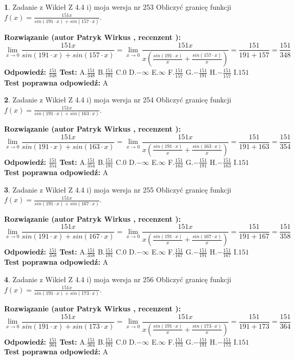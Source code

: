 \documentclass[12pt, a4paper]{article}
\theoremstyle{definition} %
\newtheorem{zad}{}
\newcommand{\zadStart}[1]{\begin{zad}#1\newline}
\newcommand{\zadStop}{\end{zad}}
\newcommand{\rozwStart}[2]{\noindent \textbf{Rozwiązanie (autor #1 , recenzent #2): }\newline}
\newcommand{\rozwStop}{\newline}
\newcommand{\odpStart}{\noindent \textbf{Odpowiedź:}\newline}
\newcommand{\odpStop}{\newline}
\newcommand{\testStart}{\noindent \textbf{Test:}\newline}
\newcommand{\testStop}{\newline}
\newcommand{\kluczStart}{\noindent \textbf{Test poprawna odpowiedź:}\newline}
\newcommand{\kluczStop}{\newline}
\begin{document}
\zadStart{Zadanie z Wikieł Z 4.4 i) moja wersja nr 253}
Obliczyć granicę funkcji $f(x)=\frac{151x}{sin(191\cdot x) +sin(157\cdot x)}$.
\zadStop
\rozwStart{Patryk Wirkus}{}
$$\lim\limits_{x\to 0}\frac{151x}{sin(191\cdot x) +sin(157\cdot x)}=\lim\limits_{x\to 0}\frac{151x}{x(\frac{sin(191\cdot x)}{x}+\frac{sin(157\cdot x)}{x})}=\frac{151}{191+157} = \frac{151}{348}$$
\rozwStop
\odpStart
$\frac{151}{348}$
\odpStop
\testStart
A.$\frac{151}{348}$
B.$\frac{151}{191}$
C.$0$
D.$-\infty$
E.$\infty$
F.$\frac{151}{157}$
G.$-\frac{151}{191}$
H.$-\frac{151}{157}$
I.$151$
\testStop
\kluczStart
A
\kluczStop



\zadStart{Zadanie z Wikieł Z 4.4 i) moja wersja nr 254}
Obliczyć granicę funkcji $f(x)=\frac{151x}{sin(191\cdot x) +sin(163\cdot x)}$.
\zadStop
\rozwStart{Patryk Wirkus}{}
$$\lim\limits_{x\to 0}\frac{151x}{sin(191\cdot x) +sin(163\cdot x)}=\lim\limits_{x\to 0}\frac{151x}{x(\frac{sin(191\cdot x)}{x}+\frac{sin(163\cdot x)}{x})}=\frac{151}{191+163} = \frac{151}{354}$$
\rozwStop
\odpStart
$\frac{151}{354}$
\odpStop
\testStart
A.$\frac{151}{354}$
B.$\frac{151}{191}$
C.$0$
D.$-\infty$
E.$\infty$
F.$\frac{151}{163}$
G.$-\frac{151}{191}$
H.$-\frac{151}{163}$
I.$151$
\testStop
\kluczStart
A
\kluczStop



\zadStart{Zadanie z Wikieł Z 4.4 i) moja wersja nr 255}
Obliczyć granicę funkcji $f(x)=\frac{151x}{sin(191\cdot x) +sin(167\cdot x)}$.
\zadStop
\rozwStart{Patryk Wirkus}{}
$$\lim\limits_{x\to 0}\frac{151x}{sin(191\cdot x) +sin(167\cdot x)}=\lim\limits_{x\to 0}\frac{151x}{x(\frac{sin(191\cdot x)}{x}+\frac{sin(167\cdot x)}{x})}=\frac{151}{191+167} = \frac{151}{358}$$
\rozwStop
\odpStart
$\frac{151}{358}$
\odpStop
\testStart
A.$\frac{151}{358}$
B.$\frac{151}{191}$
C.$0$
D.$-\infty$
E.$\infty$
F.$\frac{151}{167}$
G.$-\frac{151}{191}$
H.$-\frac{151}{167}$
I.$151$
\testStop
\kluczStart
A
\kluczStop



\zadStart{Zadanie z Wikieł Z 4.4 i) moja wersja nr 256}
Obliczyć granicę funkcji $f(x)=\frac{151x}{sin(191\cdot x) +sin(173\cdot x)}$.
\zadStop
\rozwStart{Patryk Wirkus}{}
$$\lim\limits_{x\to 0}\frac{151x}{sin(191\cdot x) +sin(173\cdot x)}=\lim\limits_{x\to 0}\frac{151x}{x(\frac{sin(191\cdot x)}{x}+\frac{sin(173\cdot x)}{x})}=\frac{151}{191+173} = \frac{151}{364}$$
\rozwStop
\odpStart
$\frac{151}{364}$
\odpStop
\testStart
A.$\frac{151}{364}$
B.$\frac{151}{191}$
C.$0$
D.$-\infty$
E.$\infty$
F.$\frac{151}{173}$
G.$-\frac{151}{191}$
H.$-\frac{151}{173}$
I.$151$
\testStop
\kluczStart
A
\kluczStop
\end{document}
